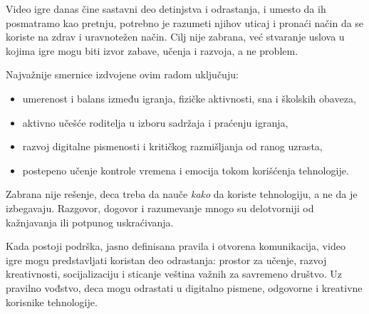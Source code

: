 \documentclass[a4paper,12pt]{article}
\begin{document}
Video igre danas čine sastavni deo detinjstva i odrastanja, i umesto da ih posmatramo kao pretnju, potrebno je razumeti njihov uticaj i pronaći način da se koriste na zdrav i uravnotežen način. Cilj nije zabrana, već stvaranje uslova u kojima igre mogu biti izvor zabave, učenja i razvoja, a ne problem.

Najvažnije smernice izdvojene ovim radom uključuju:
\begin{itemize}
    \item umerenost i balans između igranja, fizičke aktivnosti, sna i školskih obaveza,
    \item aktivno učešće roditelja u izboru sadržaja i praćenju igranja,
    \item razvoj digitalne pismenosti i kritičkog razmišljanja od ranog uzrasta,
    \item postepeno učenje kontrole vremena i emocija tokom korišćenja tehnologije.
\end{itemize}

Zabrana nije rešenje, deca treba da nauče \textit{kako} da koriste tehnologiju, a ne da je izbegavaju. Razgovor, dogovor i razumevanje mnogo su delotvorniji od kažnjavanja ili potpunog uskraćivanja.

Kada postoji podrška, jasno definisana pravila i otvorena komunikacija, video igre mogu predstavljati koristan deo odrastanja: prostor za učenje, razvoj kreativnosti, socijalizaciju i sticanje veština važnih za savremeno društvo. Uz pravilno vođstvo, deca mogu odrastati u digitalno pismene, odgovorne i kreativne korisnike tehnologije.
\end{document}
